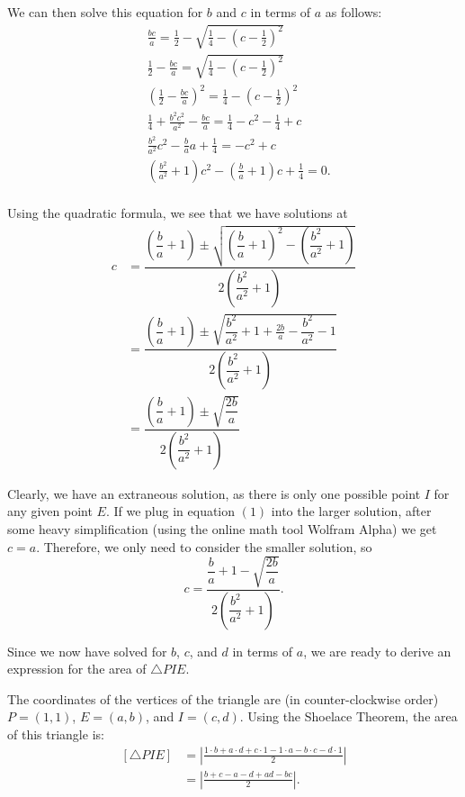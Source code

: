 \documentclass[12pt]{article}
\begin{document}
\begin{solution}{3}
    We can then solve this equation for $b$ and $c$ in terms of $a$ as follows:
    \begin{align*}
        &\frac{bc}a = \frac12 - \sqrt{\frac14 - \left(c-\frac12\right)^2} \\
        &\frac12 - \frac{bc}a = \sqrt{\frac14 - \left(c-\frac12\right)^2} \\
        &\left(\frac12 - \frac{bc}a\right)^2 = \frac14 - \left(c-\frac12\right)^2 \\
        &\frac14 + \frac{b^2c^2}{a^2} -\frac{bc}a = \frac14 - c^2 - \frac14 + c \\
        &\frac{b^2}{a^2}c^2 - \frac ba a + \frac14 = -c^2 + c \\
        &\left(\frac{b^2}{a^2} +1\right)c^2 - \left(\frac ba +1\right)c + \frac14 = 0. \\
    \end{align*}
    
    Using the quadratic formula, we see that we have solutions at
    \begin{align*}
        c
        &= \dfrac{\left(\dfrac ba +1\right)\pm\sqrt{
            \left(\dfrac ba +1\right)^2 - \left(\dfrac{b^2}{a^2} +1\right)
        }}{2\left(\dfrac{b^2}{a^2} +1\right)} \\
        &= \dfrac{\left(\dfrac ba +1\right)\pm\sqrt{
            \dfrac{b^2}{a^2} + 1 + \frac{2b}a - \dfrac{b^2}{a^2} - 1
        }}{2\left(\dfrac{b^2}{a^2} +1\right)} \\
        &= \dfrac{\left(\dfrac ba +1\right)\pm\sqrt{
            \dfrac{2b}a
        }}{2\left(\dfrac{b^2}{a^2} +1\right)}
    \end{align*}
    
    Clearly, we have an extraneous solution, as there is only one possible point $I$ for any given point $E$. If we plug in equation $(1)$ into the larger solution, after some heavy simplification (using the online math tool Wolfram Alpha) we get $c=a$. Therefore, we only need to consider the smaller solution, so
    \begin{equation*}
        c = \dfrac{
            \dfrac ba + 1 - \sqrt{\dfrac{2b}a}
        }{
            2\left(\dfrac{b^2}{a^2}+1\right)
        }. \tag{3}
    \end{equation*}
    
    Since we now have solved for $b$, $c$, and $d$ in terms of $a$, we are ready to derive an expression for the area
    of $\triangle PIE$.
    
    The coordinates of the vertices of the triangle are (in counter-clockwise order) $P=(1,1)$, $E=(a,b)$, and $I=(c,d)$.
    Using the Shoelace Theorem, the area of this triangle is:
    \begin{align*}
        \left[\triangle PIE\right]
        &= \left|\frac{ 1 \cdot b + a \cdot d + c \cdot 1 - 1 \cdot a - b \cdot c - d \cdot 1 }2\right| \\
        &= \left|\frac{ b + c - a - d + ad - bc }2\right|.
    \end{align*}
    

\end{solution}
\end{document}
